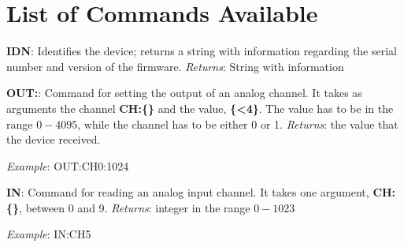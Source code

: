 \section{List of Commands Available}\label{sec:list-of-commandsavailable}
\textbf{{IDN}}: Identifies the device; returns a string with information regarding the serial number and version of the firmware. \emph{Returns}: String with information

\textbf{{OUT}:}: Command for setting the output of an analog channel. It takes as arguments the channel \textbf{{CH}:\{\}} and the value, \textbf{\{\textless{}4\}}. The value has to be in the range $0-4095$, while the channel has to be either 0 or 1. \emph{Returns}: the value that the device received.

\emph{Example}: {OUT}:{CH0}:1024

\textbf{{IN}}: Command for reading an analog input channel. It takes one argument, \textbf{{CH}:\{\}}, between 0 and 9. \emph{Returns}: integer in the range $0-1023$

\emph{Example}: {IN}:{CH5}
